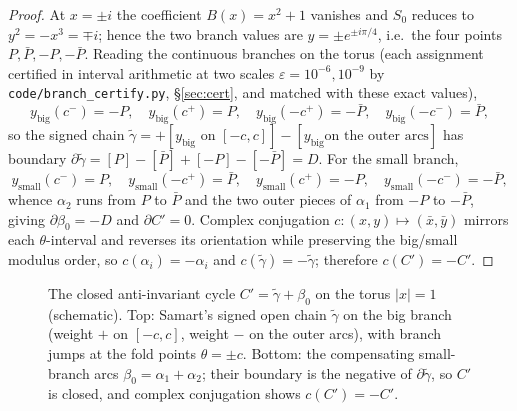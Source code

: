 \documentclass[preprint,12pt]{elsarticle}
\theoremstyle{definition}
\theoremstyle{remark}
\begin{document}
\begin{proof}
At $x=\pm i$ the coefficient $B(x)=x^2+1$ vanishes and $S_0$ reduces to
$y^2=-x^3=\mp i$; hence the two branch values are $y=\pm e^{\pm i\pi/4}$,
i.e.\ the four points $P,\bar P,-P,-\bar P$. Reading the continuous branches
on the torus (each assignment certified in interval arithmetic at two scales
$\varepsilon=10^{-6},10^{-9}$ by \texttt{code/branch\_certify.py},
\S\ref{sec:cert}, and matched with these exact values),
\[
  y_{\mathrm{big}}(c^-)=-P,\quad y_{\mathrm{big}}(c^+)=P,\quad
  y_{\mathrm{big}}(-c^+)=-\bar P,\quad y_{\mathrm{big}}(-c^-)=\bar P,
\]
so the signed chain
$\tilde\gamma=+[y_{\mathrm{big}}\text{ on }[-c,c]]-[y_{\mathrm{big}}\text{
on the outer arcs}]$ has boundary
$\partial\tilde\gamma=[P]-[\bar P]+[-P]-[-\bar P]=D$. For the small branch,
\[
  y_{\mathrm{small}}(c^-)=P,\quad y_{\mathrm{small}}(-c^+)=\bar P,\quad
  y_{\mathrm{small}}(c^+)=-P,\quad y_{\mathrm{small}}(-c^-)=-\bar P,
\]
whence $\alpha_2$ runs from $P$ to $\bar P$ and the two outer pieces of
$\alpha_1$ from $-P$ to $-\bar P$, giving
$\partial\beta_0=-D$ and $\partial C'=0$. Complex conjugation
$c:(x,y)\mapsto(\bar x,\bar y)$ mirrors each $\theta$-interval and reverses
its orientation while preserving the big/small modulus order, so
$c(\alpha_i)=-\alpha_i$ and $c(\tilde\gamma)=-\tilde\gamma$; therefore
$c(C')=-C'$.
\end{proof}

\begin{figure}[ht]
\centering
{}
\caption{The closed anti-invariant cycle $C'=\tilde\gamma+\beta_0$ on the
torus $|x|=1$ (schematic). Top: Samart's signed open chain $\tilde\gamma$ on
the big branch (weight $+$ on $[-c,c]$, weight $-$ on the outer arcs), with
branch jumps at the fold points $\theta=\pm c$. Bottom: the compensating
small-branch arcs $\beta_0=\alpha_1+\alpha_2$; their boundary is the negative
of $\partial\tilde\gamma$, so $C'$ is closed, and complex conjugation shows
$c(C')=-C'$.}
\label{fig:chain}
\end{figure}
\end{document}
